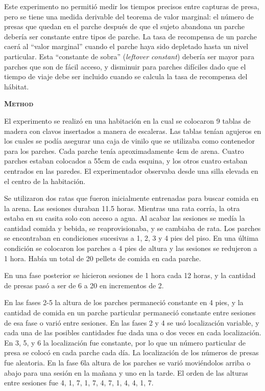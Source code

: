 \documentclass[a4paper,12pt]{article}
\begin{document}
Este experimento no permitió medir los tiempos precisos entre capturas de presa, pero se tiene una medida derivable del teorema de valor marginal: el número de presas que quedan en el parche después de que el sujeto abandona un parche debería ser constante entre tipos de parche. La tasa de recompensa de un parche caerá al ``valor marginal'' cuando el parche haya sido depletado hasta un nivel particular. Esta ``constante de sobra'' ({\itshape leftover constant}) debería ser mayor para parches que son de fácil acceso, y disminuir para parches difíciles dado que el tiempo de viaje debe ser incluido cuando se calcula la tasa de recompensa del hábitat.

{\scshape\bfseries Method}

El experimento se realizó en una habitación en la cual se colocaron 9 tablas de madera con clavos insertados a manera de escaleras. Las tablas tenían agujeros en los cuales se podía asegurar una caja de vinilo que se utilizaba como contenedor para los parches. Cada parche tenía aproximadamente 4cm de arena. Cuatro parches estaban colocados a 55cm de cada esquina, y los otros cuatro estaban centrados en las paredes. El experimentador observaba desde una silla elevada en el centro de la habitación.

Se utilizaron dos ratas que fueron inicialmente entrenadas para buscar comida en la arena. Las sesiones duraban 11.5 horas. Mientras una rata corría, la otra estaba en su casita solo con acceso a agua. Al acabar las sesiones se medía la cantidad comida y bebida, se reaprovisionaba, y se cambiaba de rata. Los parches se encontraban en condiciones sucesivas a 1, 2, 3 y 4 pies del piso. En una última condición se colocaron los parches a 4 pies de altura y las sesiones se redujeron a 1 hora. Había un total de 20 pellets de comida en cada parche.

En una fase posterior se hicieron sesiones de 1 hora cada 12 horas, y la cantidad de presas pasó a ser de 6 a 20 en incrementos de 2.

En las fases 2-5 la altura de los parches permaneció constante en 4 pies, y la cantidad de comida en un parche particular permaneció constante entre sesiones de esa fase o varió entre sesiones. En las fases 2 y 4 se usó localización variable, y cada una de las posibles cantidades fue dada una o dos veces en cada localización. En 3, 5, y 6 la localización fue constante, por lo que un número particular de presa se colocó en cada parche cada día. La localización de los números de presas fue aleatoria. En la fase 6la altura de los parches se varió moviéndolos arriba o abajo para una sesión en la mañana y uno en la tarde. El orden de las alturas entre sesiones fue 4, 1, 7, 1, 7, 4, 7, 1, 4, 4, 1, 7.
\end{document}
